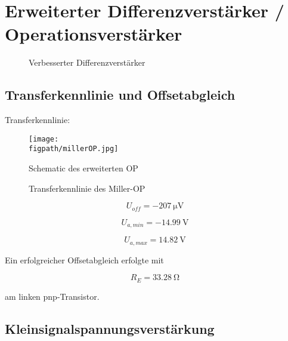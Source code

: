 \section{Erweiterter Differenzverstärker / Operationsverstärker}

\begin{figure}[H]
	\centering
	\def\svgwidth{0.9\textwidth}
	
	\caption{Verbesserter Differenzverstärker} 
	\label{fig_Kap5_13:Miller} 
\end{figure}

\subsection{Transferkennlinie und Offsetabgleich}
Transferkennlinie:

\begin{figure}[H]
    \centering
    \texttt{[image: \\figpath/millerOP.jpg]}
    \caption{Schematic des erweiterten OP}
    \label{fig_Kap5_14:SpiceSchematic}
\end{figure}

\begin{figure}[H]
	\centering \small
	\scalebox{0.9}{}
	\caption{Transferkennlinie des Miller-OP}
	\label{fig_Kap5_13:transfer}
\end{figure}

\begin{equation}
    U_{off} = -\SI{207}{\micro\volt}
\end{equation}

\begin{equation}
    U_{a,min} = -\SI{14.99}{\volt}
\end{equation}

\begin{equation}
    U_{a,max} = \SI{14.82}{\volt}
\end{equation}

Ein erfolgreicher Offsetabgleich erfolgte mit 

\begin{equation}
    R_E = \SI{33,28}{\ohm}
\end{equation}

am linken pnp-Transistor.



\subsection{Kleinsignalspannungsverstärkung}

